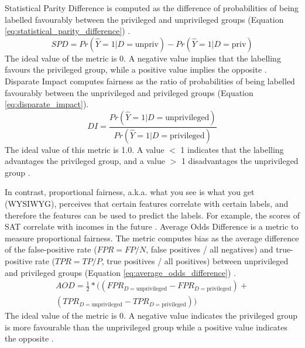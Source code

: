 \documentclass[sigconf,review]{acmart}
\begin{document}
	Statistical Parity Difference is computed as the difference of probabilities of being labelled favourably between the privileged and unprivileged groups (Equation \ref{eq:statistical_parity_difference}) \cite{dwork2012fairness,ibmaif3602022doc,bellamy2018ai}. 
	\begin{equation} \label{eq:statistical_parity_difference}
		SPD = Pr(\hat{Y} = 1 | D = \text{unpriv})
		- Pr(\hat{Y} = 1 | D = \text{priv})
	\end{equation}
	The ideal value of the metric is 0. A negative value implies that the labelling favours the privileged group, while a positive value implies the opposite \cite{ibmaif3602022doc,bellamy2018ai}. Disparate Impact \cite{feldman2015disparate,ibmaif3602022doc,bellamy2018ai} computes fairness as the ratio of probabilities of being labelled favourably between the unprivileged and privileged groups (Equation \ref{eq:disparate_impact}).
	\begin{equation} \label{eq:disparate_impact}
		DI = \frac{Pr(\hat{Y} = 1 | D = \text{unprivileged})}
		{Pr(\hat{Y} = 1 | D = \text{privileged})}
	\end{equation}
	The ideal value of this metric is 1.0. A value $<$ 1 indicates that the labelling advantages the privileged group, and a value $>$ 1 disadvantages the unprivileged group \cite{ibmaif3602022doc,bellamy2018ai}.
	
	In contrast, proportional fairness, a.k.a. what you see is what you get (WYSIWYG),  perceives that certain features correlate with certain labels, and therefore the features can be used to predict the labels. For example, the scores of SAT correlate with incomes in the future \cite{mahoney2020ai,ibmaif3602022guidance}. Average Odds Difference is a metric to measure proportional fairness. The metric computes bias as the average difference of the false-positive rate ($FPR = FP/N$, false positives / all negatives) and true-positive rate ($TPR = TP/P$, true positives / all positives) between unprivileged and privileged groups (Equation \ref{eq:average_odds_difference}) \cite{ibmaif3602022doc,bellamy2018ai}.
	\begin{equation} \label{eq:average_odds_difference}
		\begin{aligned}
			AOD = \tfrac{1}{2}* ((FPR_{D = \text{unprivileged}} - FPR_{D = \text{privileged}}) +\\
			(TPR_{D = \text{unprivileged}} - TPR_{D = \text{privileged}}))
		\end{aligned}
	\end{equation}
	The ideal value of the metric is 0. A negative value indicates the privileged group is more favourable than the unprivileged group while a positive value indicates the opposite \cite{ibmaif3602022doc,bellamy2018ai}. 
	
\end{document}

